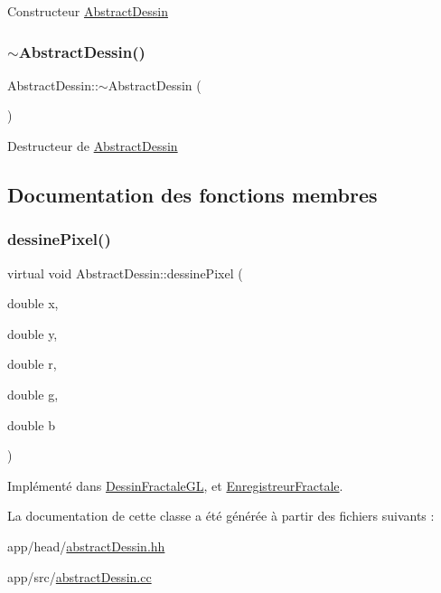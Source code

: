 Constructeur \hyperlink{classAbstractDessin}{Abstract\+Dessin} \mbox{\label{classAbstractDessin_ae543a92c1fe3b3f2b6e045a8f9b6e36d}} 
\subsubsection{\texorpdfstring{$\sim$\+Abstract\+Dessin()}{~AbstractDessin()}}
{\footnotesize\ttfamily Abstract\+Dessin\+::$\sim$\+Abstract\+Dessin (\begin{DoxyParamCaption}{ }\end{DoxyParamCaption})}

Destructeur de \hyperlink{classAbstractDessin}{Abstract\+Dessin} 

\subsection{Documentation des fonctions membres}
\mbox{\label{classAbstractDessin_a82983d17a63c236c5ca8f4966195ffe3}} 
\subsubsection{\texorpdfstring{dessine\+Pixel()}{dessinePixel()}}
{\footnotesize\ttfamily virtual void Abstract\+Dessin\+::dessine\+Pixel (\begin{DoxyParamCaption}\item[{double}]{x,  }\item[{double}]{y,  }\item[{double}]{r,  }\item[{double}]{g,  }\item[{double}]{b }\end{DoxyParamCaption})\hspace{0.3cm}{\ttfamily [pure virtual]}}



Implémenté dans \hyperlink{classDessinFractaleGL_a3f2cb057946af75ae1bb887e984c5a02}{Dessin\+Fractale\+GL}, et \hyperlink{classEnregistreurFractale_a594fe98fad6fe07acee198fb5de013ab}{Enregistreur\+Fractale}.



La documentation de cette classe a été générée à partir des fichiers suivants \+:\begin{DoxyCompactItemize}
\item 
app/head/\hyperlink{abstractDessin_8hh}{abstract\+Dessin.\+hh}\item 
app/src/\hyperlink{abstractDessin_8cc}{abstract\+Dessin.\+cc}\end{DoxyCompactItemize}
